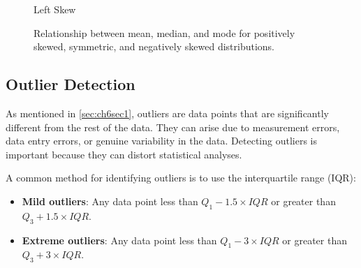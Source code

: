 \begin{figure}[htbp]
\begin{minipage}{0.32\textwidth}
    \end{minipage}
    \hfill
    \begin{minipage}{0.32\textwidth}
        \centering
        \par\small Left Skew
    \end{minipage}
    \caption{Relationship between mean, median, and mode for positively skewed, symmetric, and negatively skewed distributions.}
    \label{fig:skew_mean_median_mode}
\end{figure}

\subsection*{Outlier Detection}

As mentioned in \autoref{sec:ch6sec1}, outliers are data points that are significantly different from the rest of the data. They can arise due to measurement errors, data entry errors, or genuine variability in the data. Detecting outliers is important because they can distort statistical analyses.

A common method for identifying outliers is to use the interquartile range (IQR):

\begin{itemize}
    \item \textbf{Mild outliers}: Any data point less than $Q_1 - 1.5 \times IQR$ or greater than $Q_3 + 1.5 \times IQR$.
    \item \textbf{Extreme outliers}: Any data point less than $Q_1 - 3 \times IQR$ or greater than $Q_3 + 3 \times IQR$.
\end{itemize}

